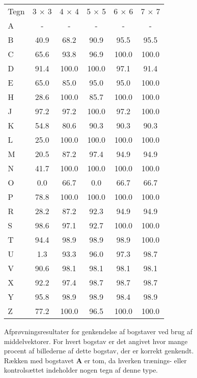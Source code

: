 \begin{figure}[htp]
\centering
\begin{tabular}{|l|c|c|c|c|c|}\hline
\rowcolor[gray]{0.9} \multicolumn{6}{|>{\columncolor[gray]{0.9}}c|}{\textbf{Middelvektor}} \\ \hline
Tegn & 3 $\times$ 3 & 4 $\times$ 4 & 5 $\times$ 5 & 6 $\times$ 6 & 7 $\times$ 7\\\hline
A & - & - & - & - & -\\\hline
B & 40.9 & 68.2 & 90.9 & 95.5 & 95.5\\\hline
C & 65.6 & 93.8 & 96.9 & 100.0 & 100.0\\\hline
D & 91.4 & 100.0 & 100.0 & 97.1 & 91.4\\\hline
E & 65.0 & 85.0 & 95.0 & 95.0 & 100.0\\\hline
H & 28.6 & 100.0 & 85.7 & 100.0 & 100.0\\\hline
J & 97.2 & 97.2 & 100.0 & 97.2 & 100.0\\\hline
K & 54.8 & 80.6 & 90.3 & 90.3 & 90.3\\\hline
L & 25.0 & 100.0 & 100.0 & 100.0 & 100.0\\\hline
M & 20.5 & 87.2 & 97.4 & 94.9 & 94.9\\\hline
N & 41.7 & 100.0 & 100.0 & 100.0 & 100.0\\\hline
O & 0.0 & 66.7 & 0.0    & 66.7 & 66.7\\\hline
P & 78.8 & 100.0 & 100.0 & 100.0 & 100.0\\\hline
R & 28.2 & 87.2 & 92.3 & 94.9 & 94.9\\\hline
S & 98.6 & 97.1 & 92.7 & 100.0 & 100.0\\\hline
T & 94.4 & 98.9 & 98.9 & 98.9 & 100.0\\\hline
U & 1.3 & 93.3 & 96.0 & 97.3 & 98.7\\\hline
V & 90.6 & 98.1 & 98.1 & 98.1 & 98.1\\\hline
X & 92.2 & 97.4 & 98.7 & 98.7 & 98.7\\\hline
Y & 95.8 & 98.9 & 98.9 & 98.4 & 98.9\\\hline
Z & 77.2 & 100.0 & 96.5 & 100.0 & 100.0\\\hline
\end{tabular}
\caption{Afprøvningsresultater for genkendelse af bogstaver ved brug af middelvektorer. For hvert bogstav er det angivet hvor mange procent af billederne af dette bogstav, der er korrekt genkendt. Rækken med bogstavet \textbf{A} er tom, da hverken trænings- eller kontrolsættet indeholder nogen tegn af denne type.}
\label{fig:test:middel_bogstav}
\end{figure}

